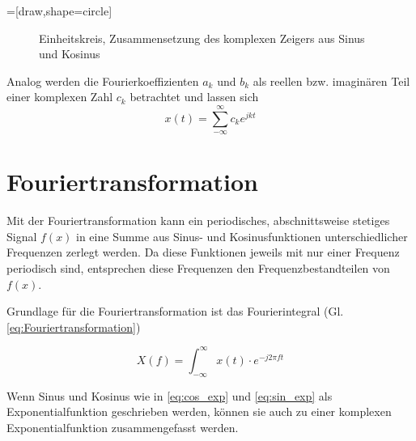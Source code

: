 =[draw,shape=circle]
\begin{figure}[ht]
\centering
{}
\caption{Einheitskreis, Zusammensetzung des komplexen Zeigers aus Sinus und Kosinus}
\label{pic:Einheitskreis}
\end{figure}


Analog werden die Fourierkoeffizienten $a_k$ und $b_k$ als reellen bzw. imaginären Teil einer komplexen Zahl $c_k$ betrachtet und lassen sich 
\begin{equation}
 x(t) = \sum_{-\infty}^{\infty} c_k e^{jkt}
\end{equation}


\section{Fouriertransformation}
Mit der Fouriertransformation kann ein periodisches, abschnittsweise stetiges Signal $f(x)$ in eine Summe aus Sinus- und
Kosinusfunktionen unterschiedlicher Frequenzen zerlegt werden. Da diese Funktionen jeweils mit nur einer Frequenz periodisch sind, entsprechen diese
Frequenzen den Frequenzbestandteilen von $f(x)$. 

Grundlage für die Fouriertransformation ist das Fourierintegral (Gl. \ref{eq:Fouriertransformation})

\begin{equation}\label{eq:Fouriertransformation}
 X(f) = \int^{\infty}_{-\infty} x(t) \cdot e^{-j 2 \pi f t}
\end{equation}

Wenn Sinus und Kosinus wie in \ref{eq:cos_exp} und \ref{eq:sin_exp} als Exponentialfunktion geschrieben werden,
können sie auch zu einer komplexen Exponentialfunktion zusammengefasst werden.







